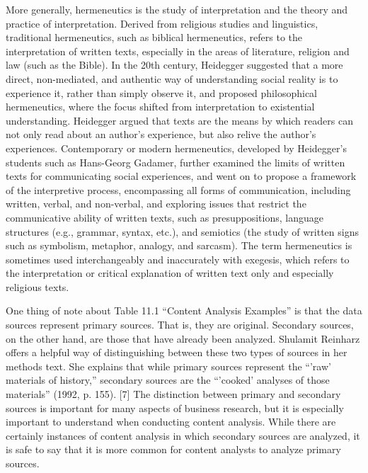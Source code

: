 More generally, hermeneutics is the study of interpretation and the theory and practice of interpretation. Derived from religious studies and linguistics, traditional hermeneutics, such as biblical hermeneutics, refers to the interpretation of written texts, especially in the areas of literature, religion and law (such as the Bible). In the 20th century, Heidegger suggested that a more direct, non-mediated, and authentic way of understanding social reality is to experience it, rather than simply observe it, and proposed philosophical hermeneutics, where the focus shifted from interpretation to existential understanding. Heidegger argued that texts are the means by which readers can not only read about an author’s experience, but also relive the author’s experiences. Contemporary or modern hermeneutics, developed by Heidegger’s students such as Hans-Georg Gadamer, further examined the limits of written texts for communicating social experiences, and went on to propose a framework of the interpretive process, encompassing all forms of communication, including written, verbal, and non-verbal, and exploring issues that restrict the communicative ability of written texts, such as presuppositions, language structures (e.g., grammar, syntax, etc.), and semiotics (the study of written signs such as symbolism, metaphor, analogy, and sarcasm). The term hermeneutics is sometimes used interchangeably and inaccurately with exegesis, which refers to the interpretation or critical explanation of written text only and especially religious texts.








One thing of note about Table 11.1 ``Content Analysis Examples'' is that the data sources represent primary sources. That is, they are original. Secondary sources, on the other hand, are those that have already been analyzed. Shulamit Reinharz offers a helpful way of distinguishing between these two types of sources in her methods text. She explains that while primary sources represent the ``'raw' materials of history,'' secondary sources are the ``'cooked' analyses of those materials'' (1992, p. 155). [7] The distinction between primary and secondary sources is important for many aspects of business research, but it is especially important to understand when conducting content analysis. While there are certainly instances of content analysis in which secondary sources are analyzed, it is safe to say that it is more common for content analysts to analyze primary sources.

